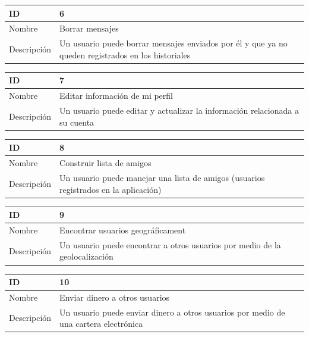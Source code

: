 \begin{center}
\begin{tabular}{|p{}|p{}|}
\hline
\textbf{ID} & 6\\
\hline
Nombre & Borrar mensajes\\
\hline
Descripción & Un usuario puede borrar mensajes enviados por él y que ya no queden registrados en los historiales\\
\hline
\end{tabular}
\vspace{2mm}

\begin{tabular}{|p{}|p{}|}
\hline
\textbf{ID} & 7\\
\hline
Nombre & Editar información de mi perfil\\
\hline
Descripción & Un usuario puede editar y actualizar la información relacionada a su cuenta \\ 
\hline
\end{tabular}
\vspace{2mm}

\begin{tabular}{|p{}|p{}|}
\hline
\textbf{ID} & 8\\
\hline
Nombre & Construir lista de amigos\\
\hline
Descripción & Un usuario puede manejar una lista de amigos (usuarios registrados en la aplicación) \\ 
\hline
\end{tabular}
\vspace{2mm}

\begin{tabular}{|p{}|p{}|}
\hline
\textbf{ID} & 9\\
\hline
Nombre & Encontrar usuarios geográficament\\
\hline
Descripción & Un usuario puede encontrar a otros usuarios por medio de la geolocalización\\ 
\hline
\end{tabular}
\vspace{2mm}

\begin{tabular}{|p{}|p{}|}
\hline
\textbf{ID} & 10\\
\hline
Nombre & Enviar dinero a otros usuarios\\
\hline
Descripción & Un usuario puede enviar dinero a otros usuarios por medio de una cartera electrónica \\
\hline
\end{tabular}
\vspace{2mm}


\end{center}
